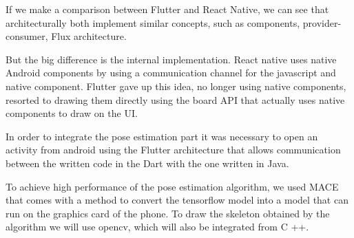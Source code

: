If we make a comparison between Flutter and React Native, we can see that architecturally both implement similar concepts, such as components, provider-consumer, Flux architecture.

But the big difference is the internal implementation.
React native uses native Android components by using a communication channel for the javascript and native component.
Flutter gave up this idea, no longer using native components, resorted to drawing them directly using the board API that actually uses native components to draw on the UI.

In order to integrate the pose estimation part it was necessary to open an activity from android using the Flutter architecture that allows communication between the written code in the Dart with the one written in Java.

To achieve high performance of the pose estimation algorithm, we used MACE that comes with a method to convert the tensorflow model into a model that can run on the graphics card of the phone.
To draw the skeleton obtained by the algorithm we will use opencv, which will also be integrated from C ++.

